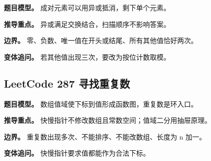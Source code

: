 \textbf{题目模型。} 成对元素可以用异或抵消，剩下单个元素。

\textbf{推导重点。} 异或满足交换结合，扫描顺序不影响答案。

\textbf{边界。} 零、负数、唯一值在开头或结尾、所有其他值恰好两次。

\textbf{变体追问。} 若其他值出现三次，要改为按位计数取模。

\subsection{LeetCode 287 寻找重复数}

\textbf{题目模型。} 数组值域使下标到值形成函数图，重复数是环入口。

\textbf{推导重点。} 快慢指针不修改数组且常数空间；值域二分用抽屉原理。

\textbf{边界。} 重复数出现多次、不能排序、不能改数组、长度为 n 加一。

\textbf{变体追问。} 快慢指针要求值都能作为合法下标。
